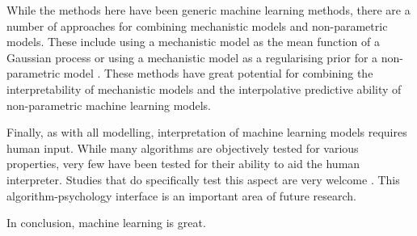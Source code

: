 \documentclass[10pt,]{article}
\begin{document}
While the methods here have been generic machine learning methods, there are a number of approaches for combining mechanistic models and non-parametric models.
These include using a mechanistic model as the mean function of a Gaussian process \citep{rasmussen2004gaussian} or using a mechanistic model as a regularising prior for a non-parametric model \citep{lyddon2018nonparametric}.
These methods have great potential for combining the interpretability of mechanistic models and the interpolative predictive ability of non-parametric machine learning models.

Finally, as with all modelling, interpretation of machine learning models requires human input.
While many algorithms are objectively tested for various properties, very few have been tested for their ability to aid the human interpreter.
Studies that do specifically test this aspect are very welcome \citep{bastani2017interpreting}.
This algorithm-psychology interface is an important area of future research.

In conclusion, machine learning is great.


\end{document}

